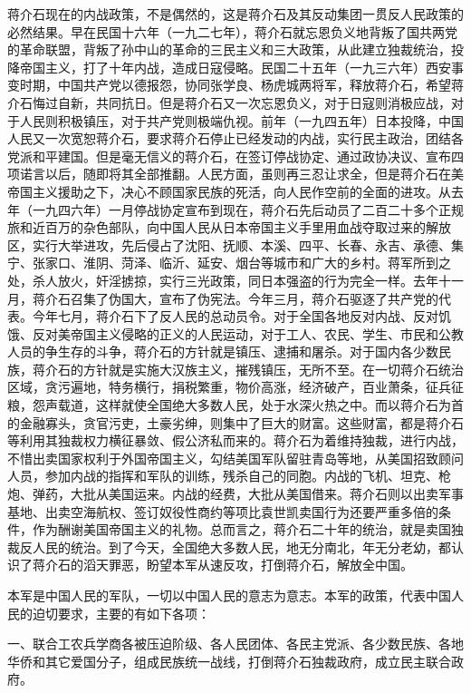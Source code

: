 蒋介石现在的内战政策，不是偶然的，这是蒋介石及其反动集团一贯反人民政策的必然结果。早在民国十六年（一九二七年），蒋介石就忘恩负义地背叛了国共两党的革命联盟，背叛了孙中山的革命的三民主义和三大政策，从此建立独裁统治，投降帝国主义，打了十年内战，造成日寇侵略。民国二十五年（一九三六年）西安事变时期，中国共产党以德报怨，协同张学良、杨虎城两将军，释放蒋介石，希望蒋介石悔过自新，共同抗日。但是蒋介石又一次忘恩负义，对于日寇则消极应战，对于人民则积极镇压，对于共产党则极端仇视。前年（一九四五年）日本投降，中国人民又一次宽恕蒋介石，要求蒋介石停止已经发动的内战，实行民主政治，团结各党派和平建国。但是毫无信义的蒋介石，在签订停战协定、通过政协决议、宣布四项诺言以后，随即将其全部推翻。人民方面，虽则再三忍让求全，但是蒋介石在美帝国主义援助之下，决心不顾国家民族的死活，向人民作空前的全面的进攻。从去年（一九四六年）一月停战协定宣布到现在，蒋介石先后动员了二百二十多个正规旅和近百万的杂色部队，向中国人民从日本帝国主义手里用血战夺取过来的解放区，实行大举进攻，先后侵占了沈阳、抚顺、本溪、四平、长春、永吉、承德、集宁、张家口、淮阴、菏泽、临沂、延安、烟台等城市和广大的乡村。蒋军所到之处，杀人放火，奸淫掳掠，实行三光政策，同日本强盗的行为完全一样。去年十一月，蒋介石召集了伪国大，宣布了伪宪法。今年三月，蒋介石驱逐了共产党的代表。今年七月，蒋介石下了反人民的总动员令。对于全国各地反对内战、反对饥饿、反对美帝国主义侵略的正义的人民运动，对于工人、农民、学生、市民和公教人员的争生存的斗争，蒋介石的方针就是镇压、逮捕和屠杀。对于国内各少数民族，蒋介石的方针就是实施大汉族主义，摧残镇压，无所不至。在一切蒋介石统治区域，贪污遍地，特务横行，捐税繁重，物价高涨，经济破产，百业萧条，征兵征粮，怨声载道，这样就使全国绝大多数人民，处于水深火热之中。而以蒋介石为首的金融寡头，贪官污吏，土豪劣绅，则集中了巨大的财富。这些财富，都是蒋介石等利用其独裁权力横征暴敛、假公济私而来的。蒋介石为着维持独裁，进行内战，不惜出卖国家权利于外国帝国主义，勾结美国军队留驻青岛等地，从美国招致顾问人员，参加内战的指挥和军队的训练，残杀自己的同胞。内战的飞机、坦克、枪炮、弹药，大批从美国运来。内战的经费，大批从美国借来。蒋介石则以出卖军事基地、出卖空海航权、签订奴役性商约等项比袁世凯卖国行为还要严重多倍的条件，作为酬谢美国帝国主义的礼物。总而言之，蒋介石二十年的统治，就是卖国独裁反人民的统治。到了今天，全国绝大多数人民，地无分南北，年无分老幼，都认识了蒋介石的滔天罪恶，盼望本军从速反攻，打倒蒋介石，解放全中国。

本军是中国人民的军队，一切以中国人民的意志为意志。本军的政策，代表中国人民的迫切要求，主要的有如下各项：

一、联合工农兵学商各被压迫阶级、各人民团体、各民主党派、各少数民族、各地华侨和其它爱国分子，组成民族统一战线，打倒蒋介石独裁政府，成立民主联合政府。

